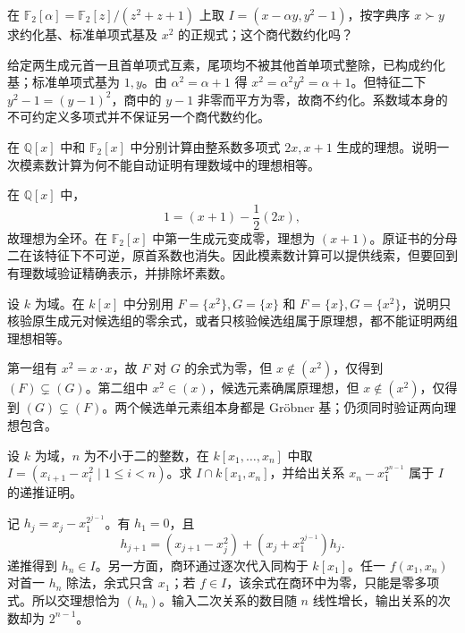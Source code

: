 \begin{exercise}\label{b3:ex:08-field-coefficients}
	在 \(\mathbb F_2[\alpha]=\mathbb F_2[z]/(z^2+z+1)\) 上取 \(I=(x-\alpha y,y^2-1)\)，按字典序 \(x\succ y\) 求约化基、标准单项式基及 \(x^2\) 的正规式；这个商代数约化吗？
\end{exercise}
\begin{solution}
	给定两生成元首一且首单项式互素，尾项均不被其他首单项式整除，已构成约化基；标准单项式基为 \(1,y\)。由 \(\alpha^2=\alpha+1\) 得 \(x^2=\alpha^2y^2=\alpha+1\)。但特征二下 \(y^2-1=(y-1)^2\)，商中的 \(y-1\) 非零而平方为零，故商不约化。系数域本身的不可约定义多项式并不保证另一个商代数约化。
\end{solution}

\begin{exercise}\label{b3:ex:08-modular-exception}
	在 \(\mathbb Q[x]\) 中和 \(\mathbb F_2[x]\) 中分别计算由整系数多项式 \(2x,x+1\) 生成的理想。说明一次模素数计算为何不能自动证明有理数域中的理想相等。
\end{exercise}
\begin{solution}
	在 \(\mathbb Q[x]\) 中，
	\[
		1=(x+1)-\dfrac{1}{2}(2x),
	\]
	故理想为全环。在 \(\mathbb F_2[x]\) 中第一生成元变成零，理想为 \((x+1)\)。原证书的分母二在该特征下不可逆，原首系数也消失。因此模素数计算可以提供线索，但要回到有理数域验证精确表示，并排除坏素数。
\end{solution}

\begin{exercise}\label{b3:ex:08-certificate-directions}
	设 \(k\) 为域。在 \(k[x]\) 中分别用 \(F=\{x^2\},G=\{x\}\) 和 \(F=\{x\},G=\{x^2\}\)，说明只核验原生成元对候选组的零余式，或者只核验候选组属于原理想，都不能证明两组理想相等。
\end{exercise}
\begin{solution}
	第一组有 \(x^2=x\cdot x\)，故 \(F\) 对 \(G\) 的余式为零，但 \(x\notin(x^2)\)，仅得到 \((F)\subsetneq(G)\)。第二组中 \(x^2\in(x)\)，候选元素确属原理想，但 \(x\notin(x^2)\)，仅得到 \((G)\subsetneq(F)\)。两个候选单元素组本身都是 Gröbner 基；仍须同时验证两向理想包含。
\end{solution}

\begin{exercise}\label{b3:ex:08-elimination-growth}
	设 \(k\) 为域，\(n\) 为不小于二的整数，在 \(k[x_1,\ldots,x_n]\) 中取 \(I=(x_{i+1}-x_i^2\mid1\le i<n)\)。求 \(I\cap k[x_1,x_n]\)，并给出关系 \(x_n-x_1^{2^{n-1}}\) 属于 \(I\) 的递推证明。
\end{exercise}
\begin{solution}
	记 \(h_j=x_j-x_1^{2^{j-1}}\)。有 \(h_1=0\)，且
	\[
		h_{j+1}=(x_{j+1}-x_j^2) +\left(x_j+x_1^{2^{j-1}}\right)h_j.
	\]
	递推得到 \(h_n\in I\)。另一方面，商环通过逐次代入同构于 \(k[x_1]\)。任一 \(f(x_1,x_n)\) 对首一 \(h_n\) 除法，余式只含 \(x_1\)；若 \(f\in I\)，该余式在商环中为零，只能是零多项式。所以交理想恰为 \((h_n)\)。输入二次关系的数目随 \(n\) 线性增长，输出关系的次数却为 \(2^{n-1}\)。
\end{solution}

